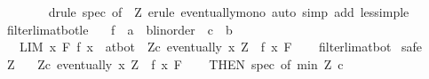 \begin{isabellebody}
\ \ \ \ \ \ \isamarkupfalse%
\ {\isacharparenleft}{\kern0pt}drule\ spec\ {\isacharbrackleft}{\kern0pt}of\ {\isacharunderscore}{\kern0pt}\ Z{\isacharbrackright}{\kern0pt}{\isacharcomma}{\kern0pt}\ erule\ eventually{\isacharunderscore}{\kern0pt}mono{\isacharcomma}{\kern0pt}\ auto\ simp\ add{\isacharcolon}{\kern0pt}\ less{\isacharunderscore}{\kern0pt}imp{\isacharunderscore}{\kern0pt}le{\isacharparenright}{\kern0pt}\isanewline
{}\isamarkupfalse%
%
\endisatagproof
{\isafoldproof}%
%
\isadelimproof
\isanewline
%
\endisadelimproof
\isanewline
{}\isamarkupfalse%
\ filterlim{\isacharunderscore}{\kern0pt}at{\isacharunderscore}{\kern0pt}bot{\isacharunderscore}{\kern0pt}le{\isacharcolon}{\kern0pt}\isanewline
\ \ \ f\ {\isacharcolon}{\kern0pt}{\isacharcolon}{\kern0pt}\ {\isachardoublequoteopen}{\isacharprime}{\kern0pt}a\ {\isasymRightarrow}\ {\isacharparenleft}{\kern0pt}{\isacharprime}{\kern0pt}b{\isacharcolon}{\kern0pt}{\isacharcolon}{\kern0pt}linorder{\isacharparenright}{\kern0pt}{\isachardoublequoteclose}\ \ c\ {\isacharcolon}{\kern0pt}{\isacharcolon}{\kern0pt}\ {\isachardoublequoteopen}{\isacharprime}{\kern0pt}b{\isachardoublequoteclose}\isanewline
\ \ \ {\isachardoublequoteopen}{\isacharparenleft}{\kern0pt}LIM\ x\ F{\isachardot}{\kern0pt}\ f\ x\ {\isacharcolon}{\kern0pt}{\isachargreater}{\kern0pt}\ at{\isacharunderscore}{\kern0pt}bot{\isacharparenright}{\kern0pt}\ {\isasymlongleftrightarrow}\ {\isacharparenleft}{\kern0pt}{\isasymforall}Z{\isasymle}c{\isachardot}{\kern0pt}\ eventually\ {\isacharparenleft}{\kern0pt}{\isasymlambda}x{\isachardot}{\kern0pt}\ Z\ {\isasymge}\ f\ x{\isacharparenright}{\kern0pt}\ F{\isacharparenright}{\kern0pt}{\isachardoublequoteclose}\isanewline
%
\isadelimproof
\ \ %
\endisadelimproof
%
\isatagproof
{}\isamarkupfalse%
\ filterlim{\isacharunderscore}{\kern0pt}at{\isacharunderscore}{\kern0pt}bot\isanewline
{}\isamarkupfalse%
\ safe\isanewline
\ \ \isamarkupfalse%
\ Z\ \isamarkupfalse%
\ {\isacharasterisk}{\kern0pt}{\isacharcolon}{\kern0pt}\ {\isachardoublequoteopen}{\isasymforall}Z{\isasymle}c{\isachardot}{\kern0pt}\ eventually\ {\isacharparenleft}{\kern0pt}{\isasymlambda}x{\isachardot}{\kern0pt}\ Z\ {\isasymge}\ f\ x{\isacharparenright}{\kern0pt}\ F{\isachardoublequoteclose}\isanewline
\ \ \isamarkupfalse%
\ {\isacharasterisk}{\kern0pt}{\isacharbrackleft}{\kern0pt}THEN\ spec{\isacharcomma}{\kern0pt}\ of\ {\isachardoublequoteopen}min\ Z\ c{\isachardoublequoteclose}{\isacharbrackright}{\kern0pt}\ \isamarkupfalse%

\end{isabellebody}
